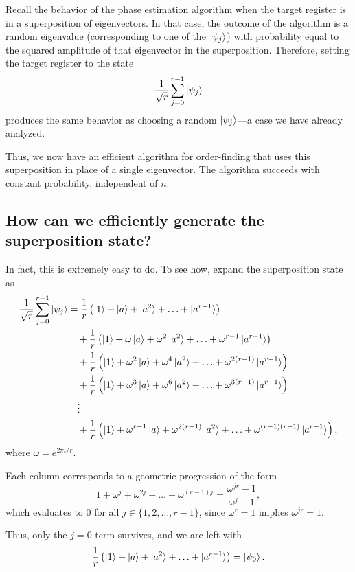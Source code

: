 Recall the behavior of the phase estimation algorithm when the target register is in a superposition of eigenvectors. In that case, the outcome of the algorithm is a random eigenvalue (corresponding to one of the $\ket{\psi_j}$) with probability equal to the squared amplitude of that eigenvector in the superposition. Therefore, setting the target register to the state
\[
\frac{1}{\sqrt{r}} \sum_{j=0}^{r-1} \ket{\psi_j}
\]
produces the same behavior as choosing a random $\ket{\psi_j}$—a case we have already analyzed.

Thus, we now have an efficient algorithm for order-finding that uses this superposition in place of a single eigenvector. The algorithm succeeds with constant probability, independent of $n$.

\subsection{How can we efficiently generate the superposition state?}

In fact, this is extremely easy to do. To see how, expand the superposition state as
\begin{align*}
    \frac{1}{\sqrt{r}} \sum_{j=0}^{r-1} \ket{\psi_j}
    &= \frac{1}{r} \left( \ket{1} + \ket{a} + \ket{a^2} + \ldots + \ket{a^{r-1}} \right) \\
    &\quad + \frac{1}{r} \left( \ket{1} + \omega \ket{a} + \omega^2 \ket{a^2} + \ldots + \omega^{r-1} \ket{a^{r-1}} \right) \\
    &\quad + \frac{1}{r} \left( \ket{1} + \omega^2 \ket{a} + \omega^4 \ket{a^2} + \ldots + \omega^{2(r-1)} \ket{a^{r-1}} \right) \\
    &\quad + \frac{1}{r} \left( \ket{1} + \omega^3 \ket{a} + \omega^6 \ket{a^2} + \ldots + \omega^{3(r-1)} \ket{a^{r-1}} \right) \\
    &\quad \vdots \\
    &\quad + \frac{1}{r} \left( \ket{1} + \omega^{r-1} \ket{a} + \omega^{2(r-1)} \ket{a^2} + \ldots + \omega^{(r-1)(r-1)} \ket{a^{r-1}} \right),
\end{align*}
where $\omega = e^{2\pi \iota / r}$.

Each column corresponds to a geometric progression of the form
\[
1 + \omega^j + \omega^{2j} + \ldots + \omega^{(r-1)j} = \frac{\omega^{jr} - 1}{\omega^j - 1},
\]
which evaluates to $0$ for all $j \in \{1,2,\ldots, r-1\}$, since $\omega^r = 1$ implies $\omega^{jr} = 1$.

Thus, only the $j = 0$ term survives, and we are left with
\[
\frac{1}{r} \left( \ket{1} + \ket{a} + \ket{a^2} + \ldots + \ket{a^{r-1}} \right) = \ket{\psi_0}.
\]

